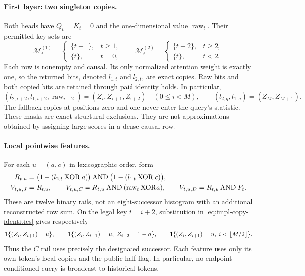 \paragraph{First layer: two singleton copies.}
Both heads have $Q_t=K_t=0$ and the one-dimensional value
$\operatorname{raw}_t$. Their permitted-key sets are
\begin{equation}\label{eq:impl-copy-masks}
 \mathcal M^{(1)}_t=\begin{cases}\{t-1\},&t\ge1,\\\{t\},&t=0,
                       \end{cases}
 \qquad
 \mathcal M^{(2)}_t=\begin{cases}\{t-2\},&t\ge2,\\\{t\},&t<2.
                       \end{cases}
\end{equation}
Each row is nonempty and causal. Its only normalized attention weight is
exactly one, so the returned bits, denoted $l_{1,t}$ and $l_{2,t}$,
are exact copies. Raw bits and both copied bits are retained through paid
identity holds. In particular,
\begin{equation}\label{eq:impl-copy-identities}
 (l_{2,i+2},l_{1,i+2},\operatorname{raw}_{i+2})
       =(Z_i,Z_{i+1},Z_{i+2})\quad(0\le i<M),\qquad
 (l_{2,q},l_{1,q})=(Z_M,Z_{M+1}).
\end{equation}
The fallback copies at positions zero and one never enter the query's
statistic. These masks are exact structural exclusions. They are not
approximations obtained by assigning large scores in a dense causal row.

\paragraph{Local pointwise features.}
For each $u=(a,c)$ in lexicographic order, form
\begin{align}
 R_{t,u}&=\bigl(1-(l_{2,t}\mathbin{\mathrm{XOR}}a)\bigr)
              \mathbin{\mathrm{AND}}
              \bigl(1-(l_{1,t}\mathbin{\mathrm{XOR}}c)\bigr),\notag\\
 V_{t,u,J}&=R_{t,u},\qquad
 V_{t,u,C}=R_{t,u}\mathbin{\mathrm{AND}}
                    (\operatorname{raw}_t\mathbin{\mathrm{XOR}}a),
 \qquad
 V_{t,u,D}=R_{t,u}\mathbin{\mathrm{AND}}F_t.
 \label{eq:impl-features}
\end{align}
These are twelve binary rails, not an eight-successor histogram with an
additional reconstructed row sum. On the legal key $t=i+2$, substitution
in \eqref{eq:impl-copy-identities} gives respectively
\begin{equation}\label{eq:impl-feature-identities}
 \mathbf 1\{(Z_i,Z_{i+1})=u\},\qquad
 \mathbf 1\{(Z_i,Z_{i+1})=u,\ Z_{i+2}=1-a\},\qquad
 \mathbf 1\{(Z_i,Z_{i+1})=u,\ i<\lfloor M/2\rfloor\}.
\end{equation}
Thus the $C$ rail uses precisely the designated successor. Each feature
uses only its own token's local copies and the public half flag. In
particular, no endpoint-conditioned query is broadcast to historical
tokens.

